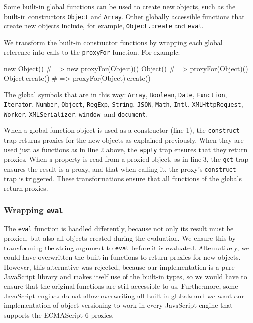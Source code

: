 \documentclass{sigplanconf}
\begin{document}
Some built-in global functions can be used to create new objects, such as the built-in constructors \lstinline{Object} and \lstinline{Array}.
Other globally accessible functions that create new objects include, for example, \lstinline{Object.create} and \lstinline{eval}.

We transform the built-in constructor functions by wrapping each global reference into calls to the \lstinline{proxyFor} function.
For example:
\begin{code}
new Object()  # => new proxyFor(Object)()
Object()  # => proxyFor(Object)()
Object.create()  # => proxyFor(Object).create()
\end{code}

The global symbols that are in this way: \lstinline{Array}, \lstinline{Boolean}, \lstinline{Date}, \lstinline{Function}, \lstinline{Iterator}, \lstinline{Number}, \lstinline{Object}, \lstinline{RegExp}, \lstinline{String}, \lstinline{JSON}, \lstinline{Math}, \lstinline{Intl}, \lstinline{XMLHttpRequest}, \lstinline{Worker}, \lstinline{XMLSerializer}, \lstinline{window}, and \lstinline{document}.

When a global function object is used as a constructor (line 1), the \lstinline{construct} trap returns proxies for the new objects as explained previously.
When they are used just as functions as in line 2 above, the \lstinline{apply} trap ensures that they return proxies.
When a property is read from a proxied object, as in line 3, the \lstinline{get} trap ensures the result is a proxy, and that when calling it, the proxy's \lstinline{construct} trap is triggered.
These transformations ensure that all functions of the globals return proxies.

\subsubsection{Wrapping \lstinline{eval}}

The \lstinline{eval} function is handled differently, because not only its result must be proxied, but also all objects created during the evaluation.
We ensure this by transforming the string argument to \lstinline{eval} before it is evaluated.
Alternatively, we could have overwritten the built-in functions to return proxies for new objects.
However, this alternative was rejected, because our implementation is a pure JavaScript library and makes itself use of the built-in types, so we would have to ensure that the original functions are still accessible to us.
Furthermore, some JavaScript engines do not allow overwriting all built-in globals and we want our implementation of object versioning to work in every JavaScript engine that supports the ECMAScript 6 proxies.
\end{document}

